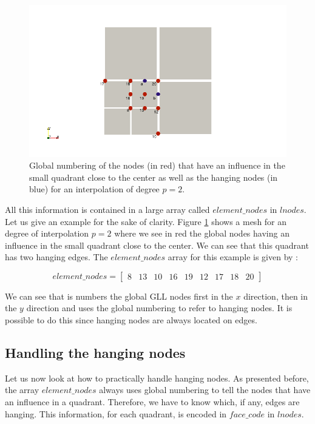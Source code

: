 \begin{figure}
\centering
\includegraphics[scale=0.5]{Implementation/nodes_ex.png}
\caption{Global numbering of the nodes (in red) that have an influence in the small quadrant close to the center as well as the hanging nodes (in blue) for an interpolation of degree $p=2$. }
\label{nodes_ex}
\end{figure}

All this information is contained in a large array called $element\_nodes$ in $lnodes$. Let us give an example for the sake of clarity. Figure \ref{nodes_ex} shows a mesh for an degree of interpolation $p=2$ where we see in red the global nodes having an influence in the small quadrant close to the center. We can see that this quadrant has two hanging edges. The $element\_nodes$ array for this example is given by : 

$$element\_nodes = \begin{bmatrix}
8 &13& 10& 16 &19& 12 &17& 18& 20
\end{bmatrix}$$

We can see that is numbers the global GLL nodes first in the $x$ direction, then in the $y$ direction and uses the global numbering to refer to hanging nodes. It is possible to do this since hanging nodes are always located on edges. 

\subsection{Handling the hanging nodes}

Let us now look at how to practically handle hanging nodes. As presented before, the array $element\_nodes$ always uses global numbering to tell the nodes that have an influence in a quadrant. Therefore, we have to know which, if any, edges are hanging. This information, for each quadrant, is encoded in $face\_code$ in $lnodes$.

